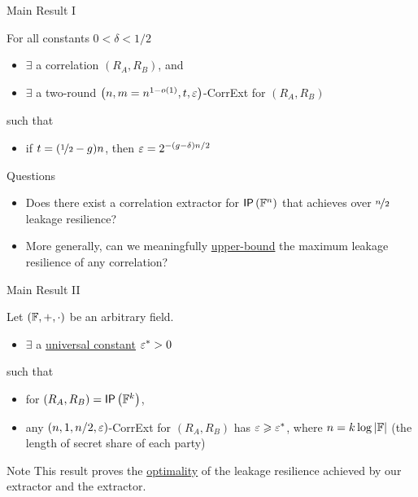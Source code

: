 \begin{frame}{Main Result I}
	\begin{theorem}
	\label{thm:construction}
	For all constants $0<\delta<1/2$
	\begin{itemize}
		\item $ \exists $ a correlation $(R_A,R_B)$, and
		\item $ \exists $ a two-round $\left(n,m = n^{1-o(1)},t,\varepsilon\right)$-CorrExt for $(R_A,R_B)$
	\end{itemize}
	such that 
	\begin{itemize}
		\item if $t=(\nicefrac12-g)n$, then $\varepsilon=2^{-(g-\delta)n/2}$
	\end{itemize} 
	\end{theorem}
	\pause
	{
	\begin{block}{Questions}
		\begin{itemize}
		\item Does there exist a correlation extractor for $ \IP[\bbF^n] $ that achieves over $ \nicefrac{n}{2} $ leakage resilience? \pause
		\item More generally, can we meaningfully \underline{upper-bound} the maximum leakage resilience of any correlation? 
		\end{itemize}
	\end{block}
	}
\end{frame}

\begin{frame}{Main Result II}
	\begin{theorem}
	\label{thm:hardness} 
	Let $({\mathbb F},+,\cdot)$ be an arbitrary field.
	\begin{itemize}
		\item $ \exists $ a \underline{universal constant} $\varepsilon^*>0$
	\end{itemize}
	such that
	\begin{itemize}
		\item  for $(R_A,R_B)=\IP [\bbF^k] $, %
		\item any $(n,1,%
		n/2,\eps)$-CorrExt for $(R_A,R_B)$ has $\varepsilon\geqslant\varepsilon^*$, where $n=k\log\left\vert{\ensuremath{{\mathbb F}}}\right\vert$ (the length of secret share of each party)  
	\end{itemize}
\end{theorem}

{
\begin{block}{Note}
	This result proves the \underline{optimality} of the leakage resilience achieved by our extractor and the \cite{C:GIMS15} extractor.
\end{block}}

\end{frame}